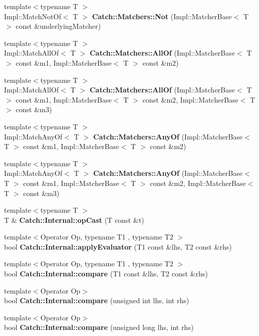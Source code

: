 \begin{DoxyCompactItemize}
{\footnotesize template$<$typename T $>$ }\\Impl\+::\+Match\+Not\+Of$<$ T $>$ \textbf{ Catch\+::\+Matchers\+::\+Not} (Impl\+::\+Matcher\+Base$<$ T $>$ const \&underlying\+Matcher)
\item 
{\footnotesize template$<$typename T $>$ }\\Impl\+::\+Match\+All\+Of$<$ T $>$ \textbf{ Catch\+::\+Matchers\+::\+All\+Of} (Impl\+::\+Matcher\+Base$<$ T $>$ const \&m1, Impl\+::\+Matcher\+Base$<$ T $>$ const \&m2)
\item 
{\footnotesize template$<$typename T $>$ }\\Impl\+::\+Match\+All\+Of$<$ T $>$ \textbf{ Catch\+::\+Matchers\+::\+All\+Of} (Impl\+::\+Matcher\+Base$<$ T $>$ const \&m1, Impl\+::\+Matcher\+Base$<$ T $>$ const \&m2, Impl\+::\+Matcher\+Base$<$ T $>$ const \&m3)
\item 
{\footnotesize template$<$typename T $>$ }\\Impl\+::\+Match\+Any\+Of$<$ T $>$ \textbf{ Catch\+::\+Matchers\+::\+Any\+Of} (Impl\+::\+Matcher\+Base$<$ T $>$ const \&m1, Impl\+::\+Matcher\+Base$<$ T $>$ const \&m2)
\item 
{\footnotesize template$<$typename T $>$ }\\Impl\+::\+Match\+Any\+Of$<$ T $>$ \textbf{ Catch\+::\+Matchers\+::\+Any\+Of} (Impl\+::\+Matcher\+Base$<$ T $>$ const \&m1, Impl\+::\+Matcher\+Base$<$ T $>$ const \&m2, Impl\+::\+Matcher\+Base$<$ T $>$ const \&m3)
\item 
{\footnotesize template$<$typename T $>$ }\\T \& \textbf{ Catch\+::\+Internal\+::op\+Cast} (T const \&t)
\item 
{\footnotesize template$<$Operator Op, typename T1 , typename T2 $>$ }\\bool \textbf{ Catch\+::\+Internal\+::apply\+Evaluator} (T1 const \&lhs, T2 const \&rhs)
\item 
{\footnotesize template$<$Operator Op, typename T1 , typename T2 $>$ }\\bool \textbf{ Catch\+::\+Internal\+::compare} (T1 const \&lhs, T2 const \&rhs)
\item 
{\footnotesize template$<$Operator Op$>$ }\\bool \textbf{ Catch\+::\+Internal\+::compare} (unsigned int lhs, int rhs)
\item 
{\footnotesize template$<$Operator Op$>$ }\\bool \textbf{ Catch\+::\+Internal\+::compare} (unsigned long lhs, int rhs)
\item 

\end{DoxyCompactItemize}
